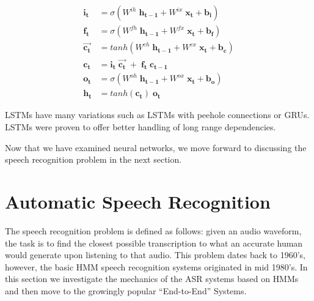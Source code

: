 \begin{align}
	\mathbf{i_t } & = \sigma(W^{ih} \; \mathbf{h_{t-1}} + W^{ix}\; \mathbf{x_t}  + \mathbf{b_i}) 
	\label{eq:6} \\ 
	\mathbf{f_t} & = \sigma(W^{fh}\;\mathbf{h_{t-1}}  + W^{fx} \; \mathbf{x_t}  + \mathbf{b_f}) 
	\label{eq:7} \\
	\mathbf{\vec{c_t}} & = tanh(W^{ch} \; \mathbf{h_{t-1}} + W^{cx}\; \mathbf{x_t} + \mathbf{b_c})
	 \label{eq:8} \\
	\mathbf{c_t} & = \mathbf{i_t } \; \mathbf{\vec{c_t}} \; + \;  \mathbf{f_t} \; \mathbf{c_{t-1}} 
	\label{eq:9} \\
	\mathbf{o_t} & = \sigma(W^{oh} \; \mathbf{h_{t-1}} + W^{ox}\; \mathbf{x_t} + \mathbf{b_o})
	 \label{eq:10} \\
	\mathbf{h_t} & = tanh(\mathbf{c_t}) \; \mathbf{o_t} \label{eq:11}
\end{align}


\ac{LSTM}s have many variations such as \ac{LSTM}s with peehole connections or \ac{GRU}s. \ac{LSTM}s were proven to offer better handling of long range dependencies.



Now that we have examined neural networks, we move forward to discussing the speech recognition problem in the next section.




















\section{Automatic Speech Recognition} 
\label{bg:s3}

The speech recognition problem is defined as follows: given an audio waveform, the task is to find the closest possible transcription to what an accurate human would generate upon listening to that audio. This problem dates back to 1960's, however, the basic \ac{HMM} speech recognition systems originated in mid 1980's. In this section we investigate the mechanics of the \ac{ASR} systems based on \ac{HMM}s and then move to the growingly popular \enquote{End-to-End} Systems.

